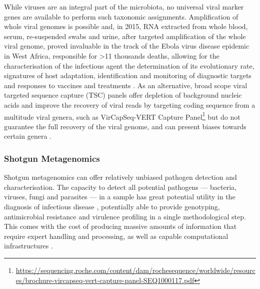 While viruses are an integral part of the microbiota, no universal viral marker genes are available to perform such taxonomic assignments. Amplification of whole viral genomes is possible and, in 2015, RNA extracted from whole blood, serum, re-suspended swabs and urine, after targeted amplification of the whole viral genome, proved invaluable in the track of the Ebola virus disease epidemic in West Africa, responsible for >11 thousands deaths, allowing for the characterisation of the infectious agent the determination of its evolutionary rate, signatures of host adaptation, identification and monitoring of diagnostic targets and responses to vaccines and treatments \citep{quick_real-time_2016}. As an alternative, broad scope viral targeted sequence capture (TSC) panels offer depletion of background nucleic acids and improve the recovery of viral reads by targeting coding sequence from a multitude viral genera, such as VirCapSeq-VERT Capture Panel\footnote{\url{https://sequencing.roche.com/content/dam/rochesequence/worldwide/resources/brochure-vircapseq-vert-capture-panel-SEQ1000117.pdf}} but do not guarantee the full recovery of the viral genome, and can present biases towards certain genera \citep{schuele_assessment_2020, wylie_enhanced_2015}. 

\subsubsection{Shotgun Metagenomics} \label{sssec:shotgun_metagenomics}

Shotgun metagenomics can offer relatively unbiased pathogen detection and characterisation. The capacity to detect all potential pathogens — bacteria, viruses, fungi and parasites — in a sample has great potential utility in the diagnosis of infectious disease \citep{chiu_clinical_2019}, potentially able to provide genotyping, antimicrobial resistance and virulence profiling in a single methodological step. This comes with the cost of producing massive amounts of information that require expert handling and processing, as well as capable computational infrastructures \citep{couto_critical_2018, rossen_practical_2018}.

